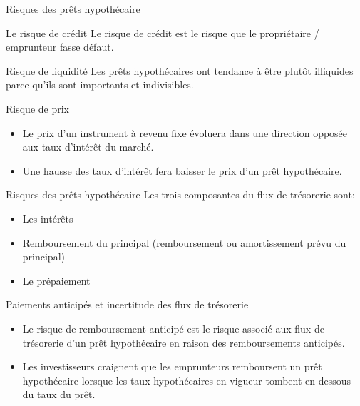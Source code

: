 \documentclass{beamer}
\begin{document}
\begin{frame}{Risques des prêts hypothécaire}
\begin{block}{Le risque de crédit}
Le risque de crédit est le risque que le propriétaire / emprunteur fasse défaut. 
\end{block}
\begin{block}{Risque de liquidité}
Les prêts hypothécaires ont tendance à être plutôt illiquides parce qu'ils sont importants et indivisibles.
\end{block}
\begin{block}{Risque de prix}
\begin{itemize}[label=\bullet]
\item Le prix d'un instrument à revenu fixe évoluera dans une direction opposée aux taux d'intérêt du marché. 
\item Une hausse des taux d'intérêt fera baisser le prix d'un prêt hypothécaire.
\end{itemize}
\end{block}
\end{frame}


\begin{frame}{Risques des prêts hypothécaire}
Les trois composantes du flux de trésorerie sont: 
\begin{itemize}[label=\bullet]
\item Les intérêts
\item Remboursement du principal (remboursement ou amortissement prévu du principal)
\item Le prépaiement
\end{itemize}

\begin{block}{Paiements anticipés et incertitude des flux de trésorerie}
\begin{itemize}[label=\bullet]
\item Le risque de remboursement anticipé est le risque associé aux flux de trésorerie d’un prêt hypothécaire en raison des remboursements anticipés.
\item Les investisseurs craignent que les emprunteurs remboursent un prêt hypothécaire lorsque les taux hypothécaires en vigueur tombent en dessous du taux du prêt.
\end{itemize}
\end{block}
\end{frame}
\end{document}
